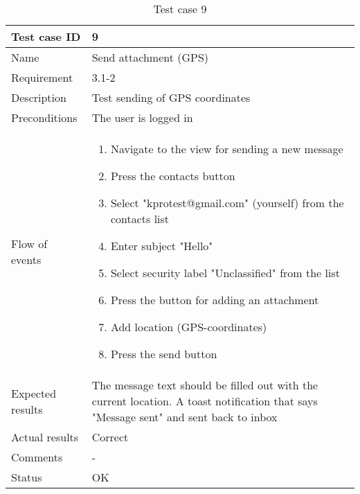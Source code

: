 		\begin{table}[htb]
			\begin{tabular}{l|p{10cm}}
				Test case ID & 9 \\ \hline
				Name & Send attachment (GPS)\\ \hline
				Requirement & 3.1-2\\ \hline
				Description & Test sending of GPS coordinates\\ \hline
				Preconditions & The user is logged in\\ \hline
				Flow of events & 
					\begin{enumerate}
						\item{}Navigate to the view for sending a new message
						\item{}Press the contacts button
						\item{}Select "kprotest@gmail.com" (yourself) from the contacts list
						\item{}Enter subject "Hello"
						\item{}Select security label "Unclassified" from the list
						\item{}Press the button for adding an attachment
						\item{}Add location (GPS-coordinates)
						\item{}Press the send button
					\end{enumerate} \\ \hline
				Expected results & The message text should be filled out with the current location. A toast notification that says "Message sent" and sent back to inbox\\ \hline
				Actual results &Correct\\ \hline
				Comments &-\\ \hline
				Status &OK\\ \hline
			\end{tabular}
			\caption{Test case 9} \label{tab:case9}
		\end{table}

